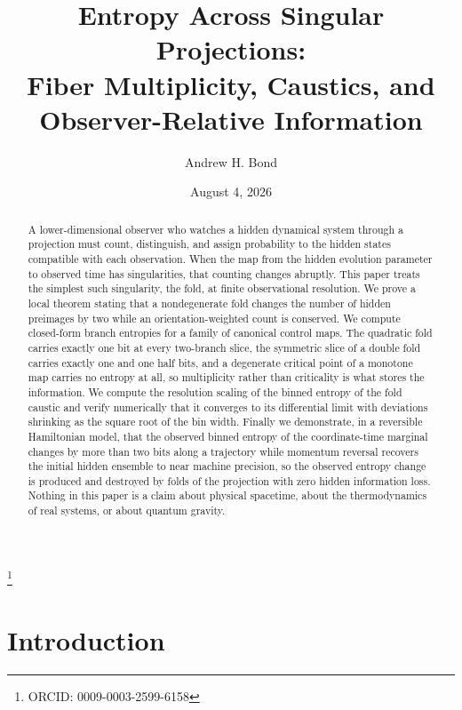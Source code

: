 \documentclass[aps,pre,reprint,nofootinbib]{revtex4-2}
\begin{document}
\title{Entropy Across Singular Projections:\\
Fiber Multiplicity, Caustics, and Observer-Relative Information}

\author{Andrew H. Bond}
\thanks{ORCID: 0009-0003-2599-6158}
\date{August 4, 2026}

\begin{abstract}
A lower-dimensional observer who watches a hidden dynamical system through a
projection must count, distinguish, and assign probability to the hidden
states compatible with each observation.  When the map from the hidden
evolution parameter to observed time has singularities, that counting changes
abruptly.  This paper treats the simplest such singularity, the fold, at
finite observational resolution.  We prove a local theorem stating that a
nondegenerate fold changes the number of hidden preimages by two while an
orientation-weighted count is conserved.  We compute closed-form branch
entropies for a family of canonical control maps.  The quadratic fold carries
exactly one bit at every two-branch slice, the symmetric slice of a double
fold carries exactly one and one half bits, and a degenerate critical point
of a monotone map carries no entropy at all, so multiplicity rather than
criticality is what stores the information.  We compute the resolution
scaling of the binned entropy of the fold caustic and verify numerically that
it converges to its differential limit with deviations shrinking as the
square root of the bin width.  Finally we demonstrate, in a reversible
Hamiltonian model, that the observed binned entropy of the coordinate-time
marginal changes by more than two bits along a trajectory while momentum
reversal recovers the initial hidden ensemble to near machine precision, so
the observed entropy change is produced and destroyed by folds of the
projection with zero hidden information loss.  Nothing in this paper is a
claim about physical spacetime, about the thermodynamics of real systems, or
about quantum gravity.
\end{abstract}

\maketitle

\section{Introduction}
\label{sec:intro}
\end{document}
